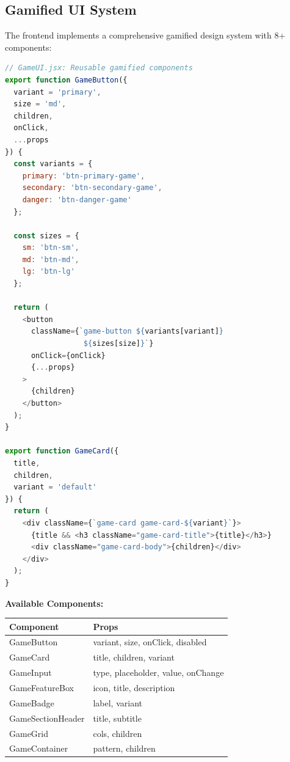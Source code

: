 \documentclass[12pt,a4paper]{report}
\newenvironment{reqbox}{%
  \begin{tcolorbox}[colback=lightgray,colframe=rulecol,
    leftrule=3pt,rightrule=0.4pt,toprule=0.4pt,bottomrule=0.4pt,
    arc=2pt,boxsep=2pt,left=4pt,right=4pt,top=3pt,bottom=3pt,breakable]
}{\end{tcolorbox}}
\newcommand{\rA}{\rowcolor{white}}
\newcommand{\rB}{\rowcolor{lightgray}}
\newcommand{\rH}{\rowcolor{headcol}}
\begin{document}
\subsection{Gamified UI System}

The frontend implements a comprehensive gamified design system with 8+ components:

\begin{lstlisting}[language=JavaScript]
// GameUI.jsx: Reusable gamified components
export function GameButton({ 
  variant = 'primary', 
  size = 'md', 
  children, 
  onClick, 
  ...props 
}) {
  const variants = {
    primary: 'btn-primary-game',
    secondary: 'btn-secondary-game',
    danger: 'btn-danger-game'
  };
  
  const sizes = {
    sm: 'btn-sm',
    md: 'btn-md',
    lg: 'btn-lg'
  };
  
  return (
    <button 
      className={`game-button ${variants[variant]} 
                  ${sizes[size]}`}
      onClick={onClick}
      {...props}
    >
      {children}
    </button>
  );
}

export function GameCard({ 
  title, 
  children, 
  variant = 'default' 
}) {
  return (
    <div className={`game-card game-card-${variant}`}>
      {title && <h3 className="game-card-title">{title}</h3>}
      <div className="game-card-body">{children}</div>
    </div>
  );
}
\end{lstlisting}

\textbf{Available Components:}

\begin{reqbox}
  \begin{tabular}{|l|l|}
    \hline
    \rH \textbf{Component} & \textbf{Props} \\
    \hline
    \rA GameButton & variant, size, onClick, disabled \\
    \hline
    \rB GameCard & title, children, variant \\
    \hline
    \rA GameInput & type, placeholder, value, onChange \\
    \hline
    \rB GameFeatureBox & icon, title, description \\
    \hline
    \rA GameBadge & label, variant \\
    \hline
    \rB GameSectionHeader & title, subtitle \\
    \hline
    \rA GameGrid & cols, children \\
    \hline
    \rB GameContainer & pattern, children \\
    \hline
  \end{tabular}
\end{reqbox}
\end{document}
